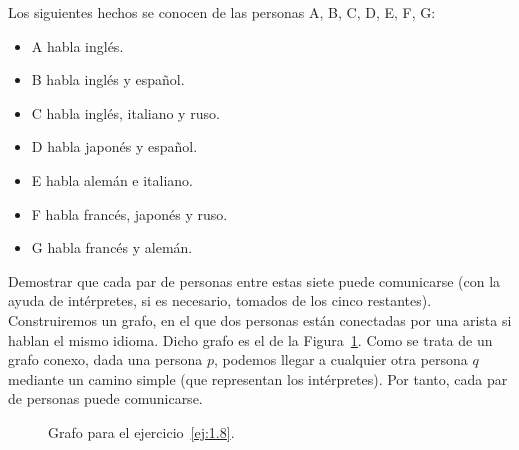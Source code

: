 \begin{ejercicio}\label{ej:1.8}
    Los siguientes hechos se conocen de las personas A, B, C, D, E, F, G:
    \begin{itemize}
        \item A habla inglés.
        \item B habla inglés y español.
        \item C habla inglés, italiano y ruso.
        \item D habla japonés y español.
        \item E habla alemán e italiano.
        \item F habla francés, japonés y ruso.
        \item G habla francés y alemán.
    \end{itemize}
    Demostrar que cada par de personas entre estas siete puede comunicarse (con la ayuda de intérpretes, si es necesario, tomados de los cinco restantes).\\

    Construiremos un grafo, en el que dos personas están conectadas por una arista si hablan el mismo idioma. Dicho grafo es el de la Figura~\ref{fig:1.8}. Como se trata de un grafo conexo, dada una persona $p$, podemos llegar a cualquier otra persona $q$ mediante un camino simple (que representan los intérpretes). Por tanto, cada par de personas puede comunicarse.
    \begin{figure}
        \centering
        \caption{Grafo para el ejercicio~\ref{ej:1.8}.}
        \label{fig:1.8}
    \end{figure}
\end{ejercicio}

